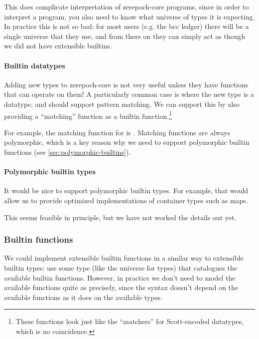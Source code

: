 This does complicate interpretation of \gls{zerepoch-core} programs, since in order to interpret a program, you also need to know what universe of types it is expecting.
In practice this is not so bad: for most users (e.g. the \gls{bcc} ledger) there will be a single universe that they use, and from there on they can simply act as though we did not have extensible builtins.

\paragraph{Builtin datatypes}

Adding new types to \gls{zerepoch-core} is not very useful unless they have functions that can operate on them!
A particularly common case is where the new type is a datatype, and should support pattern matching.
We can support this by also providing a ``matching'' function as a builtin function.\footnote{
  These functions look just like the ``matchers'' for Scott-encoded datatypes, which is no coincidence.
}

For example, the matching function for  is .
Matching functions are always polymorphic, which is a key reason why we need to support polymorphic builtin functions (see \cref{sec:polymorphic-builtins}).

\paragraph{Polymorphic builtin types}

It would be nice to support polymorphic builtin types.
For example, that would allow us to provide optimized implementations of container types such as maps.

This seems feasible in principle, but we have not worked the details out yet.

\subsubsection{Builtin functions}

We could implement extensible builtin functions in a similar way to extensible builtin types: use some type (like the universe for types) that catalogues the available builtin functions.
However, in practice we don't need to model the available functions quite as precisely, since the syntax doesn't depend on the available functions as it does on the available types.

